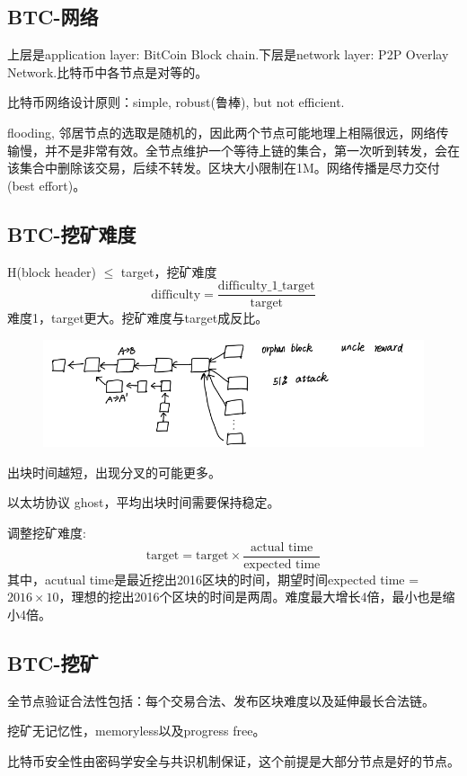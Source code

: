 \documentclass[10pt]{ctexart}
\begin{document}
\subsection{BTC-网络}
上层是application layer: BitCoin Block chain.下层是network layer: P2P Overlay Network.比特币中各节点是对等的。

比特币网络设计原则：simple, robust(鲁棒), but not efficient.

flooding, 邻居节点的选取是随机的，因此两个节点可能地理上相隔很远，网络传输慢，并不是非常有效。全节点维护一个等待上链的集合，第一次听到转发，会在该集合中删除该交易，后续不转发。区块大小限制在1M。网络传播是尽力交付(best effort)。

\subsection{BTC-挖矿难度}
H(block header) $\le$ target，挖矿难度
$$
\text{difficulty} = \frac{\text{difficulty\_1\_target}}{\text{target}}
$$
难度1，target更大。挖矿难度与target成反比。
\begin{figure}[H]
    \centering
    \includegraphics[width=1\textwidth]{courses/区块链技术与应用/lecture7/img1.png} 
\end{figure}
出块时间越短，出现分叉的可能更多。

以太坊协议 ghost，平均出块时间需要保持稳定。

调整挖矿难度:
$$
\text{target} = \text{target} \times \frac{\text{actual time}}{\text{expected time}}
$$
其中，acutual time是最近挖出2016区块的时间，期望时间expected time = $2016 \times 10$，理想的挖出2016个区块的时间是两周。难度最大增长4倍，最小也是缩小4倍。
 
\subsection{BTC-挖矿}
全节点验证合法性包括：每个交易合法、发布区块难度以及延伸最长合法链。

挖矿无记忆性，memoryless以及progress free。

比特币安全性由密码学安全与共识机制保证，这个前提是大部分节点是好的节点。
\end{document}

